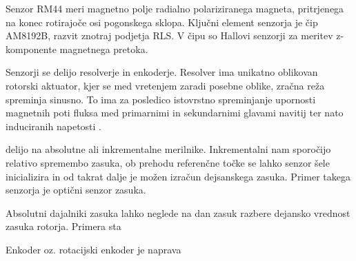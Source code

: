 Senzor RM44 meri magnetno polje radialno polariziranega magneta, pritrjenega na konec rotirajoče osi pogonskega sklopa. Ključni element senzorja je čip AM8192B, razvit znotraj podjetja RLS. V čipu so Hallovi senzorji za meritev z-komponente magnetnega pretoka. 











Senzorji se delijo resolverje in enkoderje. Resolver ima unikatno oblikovan rotorski aktuator, kjer se med vretenjem zaradi posebne oblike, zračna reža spreminja sinusno. To ima za posledico istovrstno spreminjanje upornosti magnetnih poti fluksa med primarnimi in sekundarnimi glavami navitij ter nato induciranih napetosti \cite{Ursic}.


delijo na absolutne ali inkrementalne merilnike. Inkrementalni nam sporočijo relativo spremembo zasuka, ob prehodu referenčne točke se lahko senzor šele inicializira in od takrat dalje je možen izračun dejsanskega zasuka. Primer takega senzorja je optični senzor zasuka.

Absolutni dajalniki zasuka lahko neglede na dan zasuk razbere dejansko vrednost zasuka rotorja. Primera sta 

Enkoder oz. rotacijski enkoder je naprava 